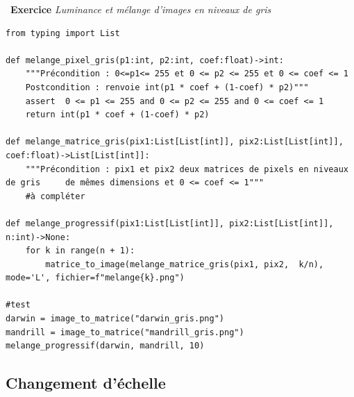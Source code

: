 \documentclass[a4paper, french, 12pt]{article}
\newcounter{exo}
\newenvironment{exercice}[1]
{\par \medskip   \addtocounter{exo}{1} \noindent  
\begin{bclogo}[arrondi =0.1,   noborder = true, logo=\bccrayon, marge=4]{~\textbf{Exercice} \textbf{\theexo} {\itshape #1} }  \par}
{
\end{bclogo}
 \par \bigskip }
\newcounter{def}
\newcounter{prog}
\begin{document}
\begin{exercice}{Luminance et mélange d'images en niveaux de gris}
\begin{enumerate}
\begin{lstlisting}[style=rond]
from typing import List

def melange_pixel_gris(p1:int, p2:int, coef:float)->int:
    """Précondition : 0<=p1<= 255 et 0 <= p2 <= 255 et 0 <= coef <= 1
    Postcondition : renvoie int(p1 * coef + (1-coef) * p2)"""
    assert  0 <= p1 <= 255 and 0 <= p2 <= 255 and 0 <= coef <= 1
    return int(p1 * coef + (1-coef) * p2)

def melange_matrice_gris(pix1:List[List[int]], pix2:List[List[int]], coef:float)->List[List[int]]:
    """Précondition : pix1 et pix2 deux matrices de pixels en niveaux de gris     de mêmes dimensions et 0 <= coef <= 1""" 
    #à compléter

def melange_progressif(pix1:List[List[int]], pix2:List[List[int]], n:int)->None:
    for k in range(n + 1):
        matrice_to_image(melange_matrice_gris(pix1, pix2,  k/n), mode='L', fichier=f"melange{k}.png")

#test  
darwin = image_to_matrice("darwin_gris.png")
mandrill = image_to_matrice("mandrill_gris.png")
melange_progressif(darwin, mandrill, 10)
\end{lstlisting}

\end{enumerate}
\end{exercice}

\vspace*{-15pt}
\subsection{Changement d'échelle}


\vspace*{-15pt}
\end{document}
